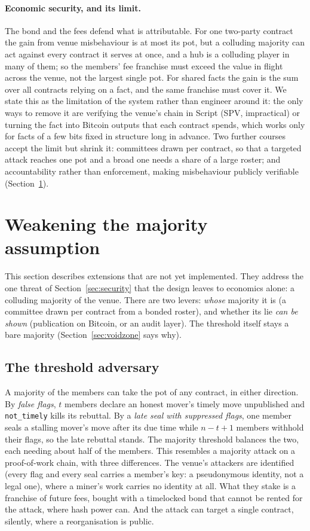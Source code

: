 \documentclass[11pt]{article}
\begin{document}
\paragraph{Economic security, and its limit.} The bond and the fees
defend what is attributable. For one two-party contract the gain from
venue misbehaviour is at most its pot, but a colluding majority can act
against every contract it serves at once, and a hub is a colluding
player in many of them; so the members' fee franchise must exceed the
value in flight across the venue, not the largest single pot.
For shared facts the gain is the sum over all contracts relying on a
fact, and the same franchise must cover it. We state this as the
limitation of the system rather than engineer around it: the only ways
to remove it are verifying the venue's chain in Script (SPV, impractical)
or turning the fact into Bitcoin outputs that each contract spends,
which works only for facts of a few bits fixed in structure long in
advance. Two further courses accept the limit but shrink it: committees
drawn per contract, so that a targeted attack reaches one pot and a
broad one needs a share of a large roster; and accountability rather
than enforcement, making misbehaviour publicly verifiable
(Section~\ref{sec:accountable}).

\section{Weakening the majority assumption}
\label{sec:accountable}

This section describes extensions that are not yet implemented. They
address the one threat of Section~\ref{sec:security} that the design
leaves to economics alone: a colluding majority of the venue. There are
two levers: \emph{whose} majority it is (a committee drawn per
contract from a bonded roster), and whether its lie \emph{can be
shown} (publication on Bitcoin, or an audit layer). The threshold
itself stays a bare majority (Section~\ref{sec:voidzone} says why).

\subsection{The threshold adversary}
\label{sec:threshold}

A majority of the members can take the pot of any contract, in either
direction. By \emph{false flags}, $t$ members declare an honest mover's
timely move unpublished and \texttt{not\_timely} kills its rebuttal.
By a \emph{late seal with suppressed flags}, one member seals a stalling
mover's move after its due time while $n - t + 1$ members withhold their
flags, so the late rebuttal stands. The majority threshold balances
the two, each needing about half of the members. This resembles a
majority attack on a proof-of-work chain, with three differences. The
venue's attackers are identified (every flag and every seal carries a
member's key: a pseudonymous identity, not a legal one), where a
miner's work carries no identity at all. What they stake is a
franchise of future fees, bought with a timelocked bond that cannot be
rented for the attack, where hash power can. And the attack can target a single contract,
silently, where a reorganisation is public.
\end{document}
